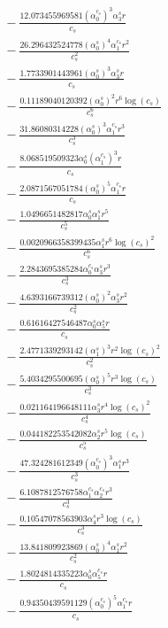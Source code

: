 \documentclass[10pt]{article}
\begin{document}
\begin{align*}
&{}  - \frac{12.073455969581 \left(\alpha_{0}^{c_s}\right)^{3} \alpha_{3}^s r}{c_{s}} \\
&{}  - \frac{26.296432524778 \left(\alpha_{0}^s\right)^{4} \alpha_{1}^{c_s} r^{2}}{c_{s}^{2}} \\
&{}  - \frac{1.7733901443961 \left(\alpha_{0}^s\right)^{3} \alpha_{3}^s r}{c_{s}} \\
&{}  - \frac{0.11189040120392 \left(\alpha_{0}^s\right)^{2} r^{6} \log{\left(c_{s} \right)}}{c_{s}^{6}} \\
&{}  - \frac{31.86080314228 \left(\alpha_{0}^s\right)^{3} \alpha_{1}^{c_s} r^{3}}{c_{s}^{3}} \\
&{}  - \frac{8.068519509323 \alpha_{0}^s \left(\alpha_{1}^{c_s}\right)^{3} r}{c_{s}} \\
&{}  - \frac{2.0871567051784 \left(\alpha_{0}^s\right)^{5} \alpha_{1}^{c_s} r}{c_{s}} \\
&{}  - \frac{1.0496651482817 \alpha_{0}^s \alpha_{1}^s r^{5}}{c_{s}^{5}} \\
&{}  - \frac{0.0020966358399435 \alpha_{1}^s r^{6} \log{\left(c_{s} \right)}^{2}}{c_{s}^{6}} \\
&{}  - \frac{2.2843695385284 \alpha_{0}^{c_s} \alpha_{3}^s r^{3}}{c_{s}^{3}} \\
&{}  - \frac{4.6393166739312 \left(\alpha_{0}^s\right)^{2} \alpha_{3}^s r^{2}}{c_{s}^{2}} \\
&{}  - \frac{0.61616427546487 \alpha_{0}^s \alpha_{5}^s r}{c_{s}} \\
&{}  - \frac{2.4771339293142 \left(\alpha_{1}^s\right)^{3} r^{2} \log{\left(c_{s} \right)}^{2}}{c_{s}^{2}} \\
&{}  - \frac{5.4034295500695 \left(\alpha_{0}^s\right)^{5} r^{3} \log{\left(c_{s} \right)}}{c_{s}^{3}} \\
&{}  - \frac{0.021164196648111 \alpha_{3}^s r^{4} \log{\left(c_{s} \right)}^{2}}{c_{s}^{4}} \\
&{}  - \frac{0.044182253542082 \alpha_{2}^s r^{5} \log{\left(c_{s} \right)}}{c_{s}^{5}} \\
&{}  - \frac{47.324281612349 \left(\alpha_{0}^{c_s}\right)^{3} \alpha_{1}^s r^{3}}{c_{s}^{3}} \\
&{}  - \frac{6.1087812576758 \alpha_{1}^{c_s} \alpha_{2}^{c_s} r^{3}}{c_{s}^{3}} \\
&{}  - \frac{0.10547078563903 \alpha_{4}^s r^{3} \log{\left(c_{s} \right)}}{c_{s}^{3}} \\
&{}  - \frac{13.841809923869 \left(\alpha_{0}^s\right)^{4} \alpha_{1}^s r^{2}}{c_{s}^{2}} \\
&{}  - \frac{1.8024814335223 \alpha_{0}^s \alpha_{5}^{c_s} r}{c_{s}} \\
&{}  - \frac{0.94350439591129 \left(\alpha_{0}^{c_s}\right)^{5} \alpha_{1}^{c_s} r}{c_{s}}
\end{align*}
\end{document}
